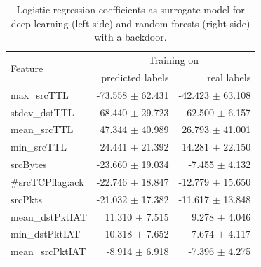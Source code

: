 \documentclass[sigconf,nonacm]{acmart}
\begin{document}
\begin{table}
 \caption{Logistic regression coefficients as surrogate model for deep learning (left side) and random forests (right side) with a backdoor.} \label{tab:logreg_coeff_bd}
\begin{tabular}{l r r} \toprule 
\multirow{2}{*}{Feature} & \multicolumn{2}{c}{Training on} \\
  & predicted labels & real labels \\ \midrule
         max\_srcTTL &  -73.558 $\pm$ 62.431 &  -42.423 $\pm$ 63.108 \\
       stdev\_dstTTL &  -68.440 $\pm$ 29.723 &  -62.500 $\pm$ 6.157 \\
        mean\_srcTTL &   47.344 $\pm$ 40.989 &   26.793 $\pm$ 41.001 \\
         min\_srcTTL &   24.441 $\pm$ 21.392 &   14.281 $\pm$ 22.150 \\
            srcBytes &  -23.660 $\pm$ 19.034 &   -7.455 $\pm$ 4.132 \\
    \#srcTCPflag:ack &  -22.746 $\pm$ 18.847 &  -12.779 $\pm$ 15.650 \\
             srcPkts &  -21.032 $\pm$ 17.382 &  -11.617 $\pm$ 13.848 \\
     mean\_dstPktIAT &   11.310 $\pm$ 7.515 &    9.278 $\pm$ 4.046 \\
      min\_dstPktIAT &  -10.318 $\pm$ 7.652 &   -7.674 $\pm$ 4.117 \\
     mean\_srcPktIAT &   -8.914 $\pm$ 6.918 &   -7.396 $\pm$ 4.275 \\

\end{tabular}
\end{table}
\end{document}
